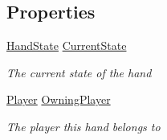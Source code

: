 \subsection*{Properties}
\begin{DoxyCompactItemize}
\item 
\mbox{\hyperlink{class_player_hand_a1af76750da713cbc88856161d8d5ac0e}{Hand\+State}} \mbox{\hyperlink{class_player_hand_a6eb1eff28793294622f4037a0aa7afeb}{Current\+State}}
\begin{DoxyCompactList}\small\item\em The current state of the hand \end{DoxyCompactList}\item 
\mbox{\hyperlink{class_player}{Player}} \mbox{\hyperlink{class_player_hand_a0d33095483c291ac3dd5b5350974b626}{Owning\+Player}}
\begin{DoxyCompactList}\small\item\em The player this hand belongs to \end{DoxyCompactList}\end{DoxyCompactItemize}
